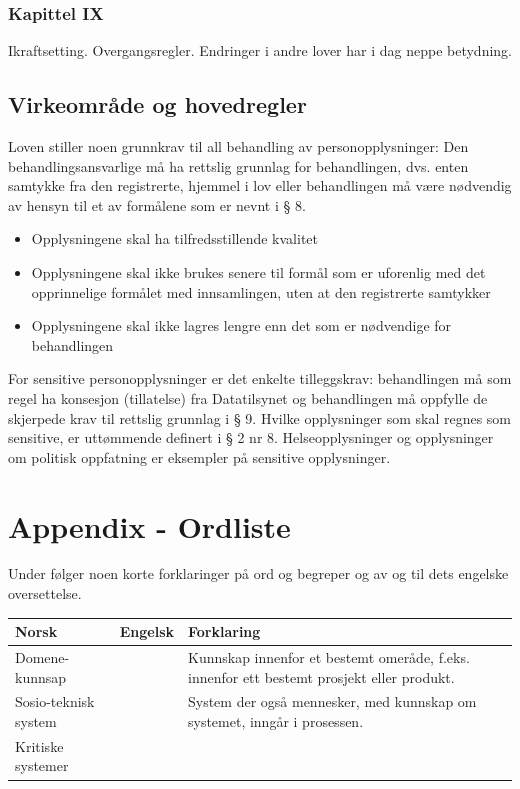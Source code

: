 \documentclass[11pt]{article}
\begin{document}
\subsubsection{Kapittel IX}
\label{sec-17.2.9}

    Ikraftsetting. Overgangsregler. Endringer i andre lover har i dag neppe betydning.
\subsection{Virkeområde og hovedregler}
\label{sec-17.3}

   Loven stiller noen grunnkrav til all behandling av personopplysninger:
   Den behandlingsansvarlige må ha rettslig grunnlag for behandlingen, dvs. enten samtykke fra den registrerte, hjemmel i lov eller behandlingen må være nødvendig av hensyn til et av formålene som er nevnt i § 8.
\begin{itemize}
\item Opplysningene skal ha tilfredsstillende kvalitet
\item Opplysningene skal ikke brukes senere til formål som er uforenlig med det
     opprinnelige formålet med innsamlingen, uten at den registrerte samtykker
\item Opplysningene skal ikke lagres lengre enn det som er nødvendige for behandlingen
\end{itemize}

   For sensitive personopplysninger er det enkelte tilleggskrav:
   behandlingen må som regel ha konsesjon (tillatelse) fra Datatilsynet og behandlingen
   må oppfylle de skjerpede krav til rettslig grunnlag i § 9. Hvilke opplysninger som
   skal regnes som sensitive, er uttømmende definert i § 2 nr 8. Helseopplysninger og
   opplysninger om politisk oppfatning er eksempler på sensitive opplysninger.
\section{Appendix - Ordliste}
\label{sec-18}

  Under følger noen korte forklaringer på ord og begreper og av og til dets engelske oversettelse.

\begin{center}
\begin{tabular}{lll}
\hline
 \textbf{Norsk}        &  \textbf{Engelsk}  &  \textbf{Forklaring}                                                                        \\
\hline
 Domene-kunnsap        &                    &  Kunnskap innenfor et bestemt omeråde, f.eks. innenfor ett bestemt prosjekt eller produkt.  \\
 Sosio-teknisk system  &                    &  System der også mennesker, med kunnskap om systemet, inngår i prosessen.                   \\
 Kritiske systemer     &                    &                                                                                             \\
\hline
\end{tabular}
\end{center}
\end{document}
